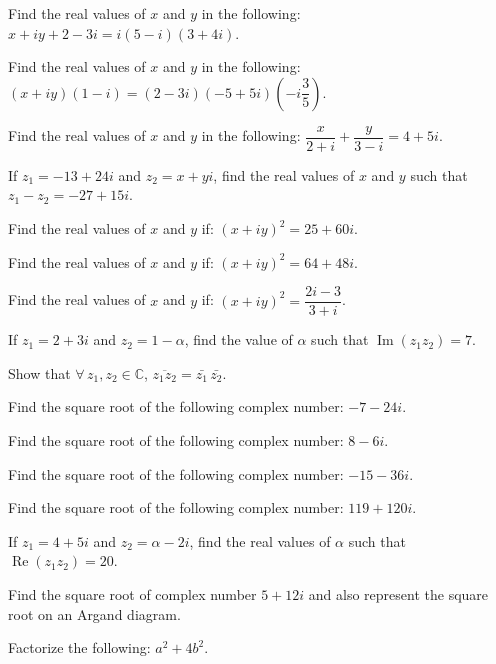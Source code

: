 \documentclass[11pt,a4paper]{article}
\begin{document}
\begin{shortlist}
\item Find the real values of $x$ and $y$ in the following: $x+iy+2-3i=i(5-i)(3+4i)$.

\item Find the real values of $x$ and $y$ in the following: $(x+iy)(1-i)=(2-3i)(-5+5i)\left(-i\dfrac{3}{5}\right)$.

\item Find the real values of $x$ and $y$ in the following: $\dfrac{x}{2+i}+\dfrac{y}{3-i}=4+5i$.

\item If $z_1=-13+24i$ and $z_2=x+yi$, find the real values of $x$ and $y$ such that $z_1-z_2=-27+15i$.

\item Find the real values of $x$ and $y$ if: $(x+iy)^2=25+60i$.

\item Find the real values of $x$ and $y$ if: $(x+iy)^2=64+48i$.

\item Find the real values of $x$ and $y$ if: $(x+iy)^2=\dfrac{2i-3}{3+i}$.

\item If $z_1=2+3i$ and $z_2=1-\alpha$, find the value of $\alpha$ such that $\operatorname{Im}(z_1z_2)=7$.

\item Show that $\forall\, z_1,z_2\in\mathbb{C}$, $\overline{z_1 z_2}=\bar{z_1}\,\bar{z_2}$.

\item Find the square root of the following complex number: $-7-24i$.

\item Find the square root of the following complex number: $8-6i$.

\item Find the square root of the following complex number: $-15-36i$.

\item Find the square root of the following complex number: $119+120i$.

\item If $z_1=4+5i$ and $z_2=\alpha-2i$, find the real values of $\alpha$ such that $\operatorname{Re}(z_1z_2)=20$.

\item Find the square root of complex number $5+12i$ and also represent the square root on an Argand diagram.

\item Factorize the following: $a^2+4b^2$.


\end{shortlist}
\end{document}
